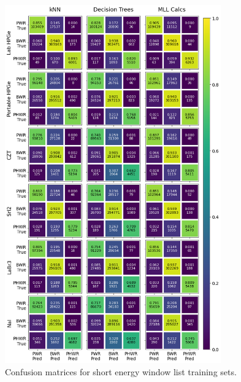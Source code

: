 \begin{figure}[H]
  \centering
  \includegraphics[width=0.83\textwidth]{./chapters/exp2/confusion_matrix_6dets_short.png}
  \caption{Confusion matrices for short energy window list training sets.}
  \label{fig:cm_short}
\end{figure}

